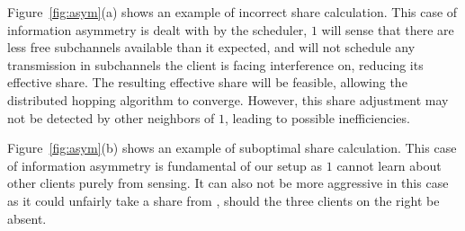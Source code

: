  Figure~\ref{fig:asym}(a) shows an example of incorrect share calculation. 
This case of information asymmetry is dealt with by the scheduler, \eNB $1$ will sense that there are less free subchannels available than it expected, and will not schedule any transmission in subchannels the client is facing interference on, reducing its effective share. The resulting effective share will be feasible, allowing the distributed hopping algorithm to converge. However, this share adjustment may not be detected by other neighbors of \eNB $1$, leading to possible inefficiencies.


 Figure~\ref{fig:asym}(b) shows an example of suboptimal share calculation.
This case of information asymmetry is fundamental of our setup as \eNB $1$ cannot learn about other clients purely from sensing. It can also not be more aggressive in this case as it could unfairly take a share from , should the three clients on the right be absent. 

